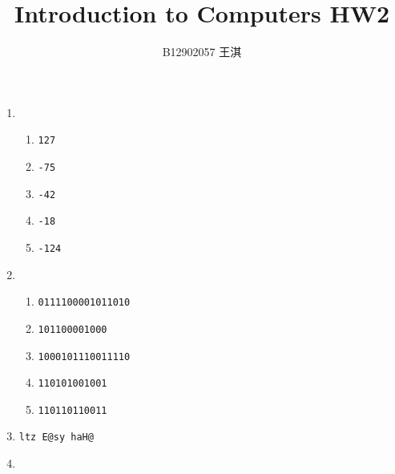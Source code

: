 \documentclass[12pt,a4paper]{article}
\begin{document}
  \title{\vspace{-4em}Introduction to Computers \textbf{HW2}}
  \author{B12902057 王淇}
  \date{}
  \maketitle
  \begin{enumerate}
    \item 
      \begin{enumerate}
        \item \texttt{127}
        \item \texttt{-75}
        \item \texttt{-42}
        \item \texttt{-18}
        \item \texttt{-124}
      \end{enumerate}
      \item 
      \begin{enumerate}
        \item \texttt{0111100001011010}
        \item \texttt{101100001000}
        \item \texttt{1000101110011110}
        \item \texttt{110101001001}
        \item \texttt{110110110011}
      \end{enumerate}
      \item \texttt{ltz E@sy haH@}
      \item 
\end{enumerate}
\end{document}
